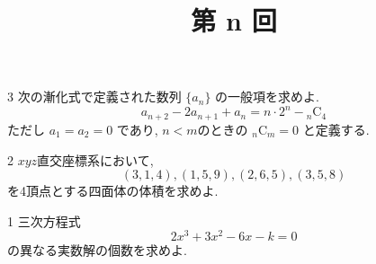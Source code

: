 \documentclass[uplatex,b5paper]{jsarticle}
\title{第 n 回}
\begin{document}
\maketitle

\begin{prob}3
  次の漸化式で定義された数列 \(\{a_n\}\) の一般項を求めよ.
  \[a_{n+2} - 2a_{n+1} + a_n = n\cdot2^n - {}_n\mathrm C_4\]
  ただし \(a_1 = a_2 = 0\) であり, \(n<m\)のときの \({}_n\mathrm C_m = 0\) と定義する.
\end{prob}
\begin{prob}2
  \(xyz\)直交座標系において,
  \[(3,1,4), (1,5,9), (2,6,5), (3,5,8)\]
  を4頂点とする四面体の体積を求めよ.
\end{prob}
\begin{prob}1
  三次方程式
  \[2x^3+3x^2-6x-k=0\]
  の異なる実数解の個数を求めよ.
\end{prob}
\probends
\end{document}
